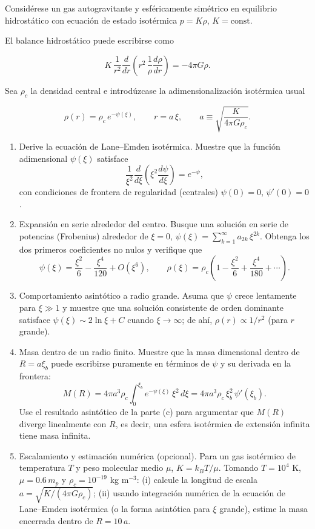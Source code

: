 Considérese un gas autogravitante y esféricamente simétrico en equilibrio hidrostático con ecuación de estado isotérmica $p = K\rho$, $K = \mathrm{const}$.

El balance hidrostático puede escribirse como

$$ K\,\frac{1}{r^2}\frac{d}{dr}\left(r^2\,\frac{1}{\rho}\frac{d\rho}{dr}\right) = -4\pi G\rho. $$

Sea $\rho_c$ la densidad central e introdúzcase la adimensionalización isotérmica usual

$$ \rho(r) = \rho_c\, e^{-\psi(\xi)}, \qquad r = a\,\xi, \qquad a \equiv \sqrt{\frac{K}{4\pi G\rho_c}}. $$

\begin{enumerate}
\item[(a)] Derive la ecuación de Lane--Emden isotérmica. Muestre que la función adimensional $\psi(\xi)$ satisface
$$ \frac{1}{\xi^2}\frac{d}{d\xi}\left(\xi^2\frac{d\psi}{d\xi}\right) = e^{-\psi}, $$
con condiciones de frontera de regularidad (centrales) $\psi(0) = 0$, $\psi'(0) = 0$.
\item[(b)] Expansión en serie alrededor del centro. Busque una solución en serie de potencias (Frobenius) alrededor de $\xi = 0$, $\psi(\xi) = \sum_{k=1}^{\infty} a_{2k}\,\xi^{2k}$. Obtenga los dos primeros coeficientes no nulos y verifique que
$$ \psi(\xi) = \frac{\xi^2}{6} - \frac{\xi^4}{120} + O(\xi^6), \qquad \rho(\xi) = \rho_c\left(1 - \frac{\xi^2}{6} + \frac{\xi^4}{180} + \cdots\right). $$
\item[(c)] Comportamiento asintótico a radio grande. Asuma que $\psi$ crece lentamente para $\xi \gg 1$ y muestre que una solución consistente de orden dominante satisface $\psi(\xi) \sim 2\ln\xi + C$ cuando $\xi \to \infty$; de ahí, $\rho(r) \propto 1/r^2$ (para $r$ grande).
\item[(d)] Masa dentro de un radio finito. Muestre que la masa dimensional dentro de $R = a\xi_b$ puede escribirse puramente en términos de $\psi$ y su derivada en la frontera:
$$ M(R) = 4\pi a^3 \rho_c \int_0^{\xi_b} e^{-\psi(\xi)}\,\xi^2\,d\xi = 4\pi a^3 \rho_c\, \xi_b^2\, \psi'(\xi_b). $$
Use el resultado asintótico de la parte (c) para argumentar que $M(R)$ diverge linealmente con $R$, es decir, una esfera isotérmica de extensión infinita tiene masa infinita.
\item[(e)] Escalamiento y estimación numérica (opcional). Para un gas isotérmico de temperatura $T$ y peso molecular medio $\mu$, $K = k_B T/\mu$. Tomando $T = 10^4$ K, $\mu = 0.6\,m_p$ y $\rho_c = 10^{-19}$ kg m$^{-3}$: (i) calcule la longitud de escala $a = \sqrt{K/(4\pi G\rho_c)}$; (ii) usando integración numérica de la ecuación de Lane--Emden isotérmica (o la forma asintótica para $\xi$ grande), estime la masa encerrada dentro de $R = 10\,a$.
\end{enumerate}

